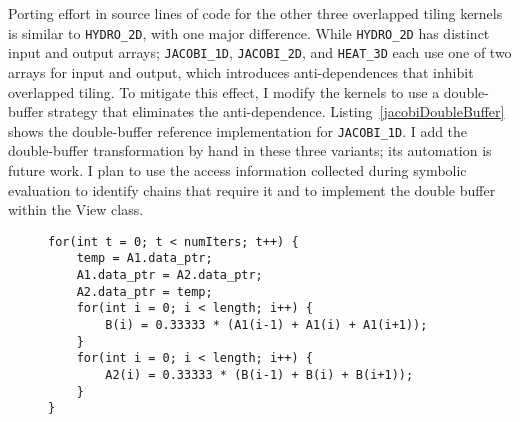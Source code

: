 Porting effort in source lines of code
for the other three overlapped tiling kernels is similar to 
\verb.HYDRO_2D., with one major difference.  
While \verb.HYDRO_2D. has distinct input and output arrays; \verb.JACOBI_1D., 
\verb.JACOBI_2D., and \verb.HEAT_3D. each use one of two arrays for
input and output, which introduces anti-dependences that inhibit 
overlapped tiling. 
To mitigate this effect, I modify the kernels to use
a double-buffer strategy that eliminates the anti-dependence. 
Listing~\ref{jacobiDoubleBuffer} shows the double-buffer reference
implementation for \verb.JACOBI_1D..
I add the double-buffer transformation by hand in these three variants;
its automation is future work.
I plan to use the access information collected during symbolic evaluation
to identify chains that require it and to implement the double buffer within
the View class.
\begin{figure}[t]
\begin{lstlisting}[label={jacobiDoubleBuffer},caption={Double-Buffer Implementation for JACOBI\_1D}]
for(int t = 0; t < numIters; t++) {
	temp = A1.data_ptr;
	A1.data_ptr = A2.data_ptr;
	A2.data_ptr = temp;
	for(int i = 0; i < length; i++) {
		B(i) = 0.33333 * (A1(i-1) + A1(i) + A1(i+1));
	}
	for(int i = 0; i < length; i++) {
		A2(i) = 0.33333 * (B(i-1) + B(i) + B(i+1));
	}
}
\end{lstlisting}
\end{figure}

